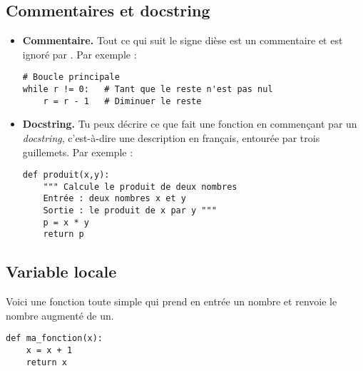 \documentclass[11pt,class=report,crop=false]{standalone}
\begin{document}
\subsection{Commentaires et docstring}

\begin{itemize}
  \item \textbf{Commentaire.} Tout ce qui suit le signe dièse \ci{#} est un commentaire et est ignoré par \Python. 
  Par exemple :
\begin{lstlisting}
# Boucle principale
while r != 0:   # Tant que le reste n'est pas nul
    r = r - 1   # Diminuer le reste
\end{lstlisting}
  
  \item \textbf{Docstring.} Tu peux décrire ce que fait une fonction en commençant par un \emph{docstring}, c'est-à-dire une description     
en français, entourée par trois guillemets.  
 Par exemple :
\begin{lstlisting}
def produit(x,y):
    """ Calcule le produit de deux nombres
    Entrée : deux nombres x et y
    Sortie : le produit de x par y """
    p = x * y
    return p 
\end{lstlisting} 

\end{itemize}


\subsection{Variable locale}


Voici une fonction toute simple qui prend en entrée un nombre et renvoie le nombre augmenté de un.
\begin{center}
\begin{lstlisting}
def ma_fonction(x):
    x = x + 1
    return x
\end{lstlisting}
\end{center}
\end{document}
